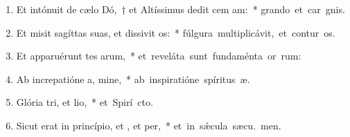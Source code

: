 \begin{flushleft}
\begin{enumerate}[leftmargin=*]
\item Et intónuit de cælo Dó,~† et Altíssimus dedit cem am:~* \mbox{grando et car gnis.}
\item Et misit sagíttas suas, et dissivit os:~* \mbox{fúlgura multiplicávit, et contur os.}
\item Et apparuérunt tes arum,~* \mbox{et reveláta sunt fundaménta or rum:}
\item Ab increpatióne a, mine,~* \mbox{ab inspiratióne spíritus  æ.}
\item Glória tri, et lio,~* \mbox{et Spirí cto.}
\item Sicut erat in princípio, et , et per,~* \mbox{et in s\'{\ae}cula sæcu. men.}

\end{enumerate}
\end{flushleft}

